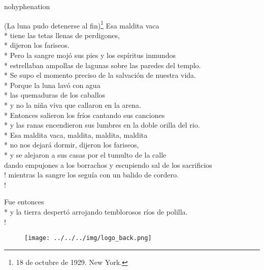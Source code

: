 \documentclass[
    a5paper,
    DIV=10,
    12pt,
    notitlepage,
    oneside,]
{scrbook} %
\begin{document}
\begin{hyphenrules}{nohyphenation}
\begin{poem}{(La luna pudo detenerse al fin)}{\footnote{18 de octubre de 1929. New York.}}{}
Esa maldita vaca\\*
tiene las tetas llenas de perdigones,\\*
dijeron los fariseos.\\*
Pero la sangre mojó sus pies y los espíritus inmundos\\*
estrellaban ampollas de lagunas sobre las paredes del templo.\\*
Se supo el momento preciso de la salvación de nuestra vida.\\*
Porque la luna lavó con agua\\*
las quemaduras de los caballos\\*
y no la niña viva que callaron en la arena.\\*
Entonces salieron los fríos cantando sus canciones\\*
y las ranas encendieron sus lumbres en la doble orilla del rio.\\*
Esa maldita vaca, maldita, maldita, maldita\\*
no nos dejará dormir, dijeron los fariseos,\\*
y se alejaron a sus casas por el tumulto de la calle\\
dando empujones a los borrachos y escupiendo sal de los sacrificios\\!
\vspace{-2em}mientras la sangre los seguía con un balido de cordero.\\!

Fue entonces\\*
y la tierra despertó arrojando temblorosos ríos de polilla.\\!

\end{poem}

\end{hyphenrules} %
\newpage
\vspace{5em}

\begin{figure}[p]
    \centering
    \texttt{[image: ../../../img/logo\_back.png]}
    \label{fig:logo}
\end{figure}
\end{document}
